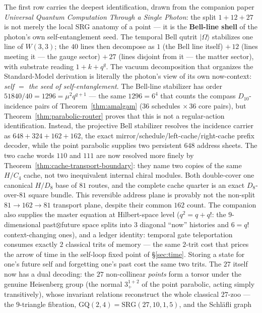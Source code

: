 \documentclass[11pt]{article}
\newcommand{\W}{W(3,3)}
\newcommand{\ket}[1]{|#1\rangle}
\begin{document}
The first row carries the deepest identification, drawn from the
companion paper \emph{Universal Quantum Computation Through a Single
Photon}: the split $1+12+27$ is not merely the local SRG anatomy of a
point --- it is the \textbf{Bell-line shell} of the photon's own
self-entanglement seed.  The temporal Bell qutrit $\ket\Omega$
stabilizes one line of $\W$; the $40$ lines then decompose as $1$
(the Bell line itself) $+\,12$ (lines meeting it --- the gauge
sector) $+\,27$ (lines disjoint from it --- the matter sector), with
substrate reading $1+k+q^q$.  The vacuum decomposition that organizes
the Standard-Model derivation is literally the photon's view of its
own now-context: \emph{self $=$ the seed of self-entanglement}.  The
Bell-line stabilizer has order $51840/40=1296=\mu^2 q^{q+1}$ --- the
same $1296=6^4$ that counts the compass $D_{10}$-incidence pairs of
Theorem~\ref{thm:amalgam} ($36$ schedules $\times\,36$ core pairs),
but Theorem~\ref{thm:parabolic-router} proves that this is not a
regular-action identification.  Instead, the projective Bell
stabilizer resolves the incidence carrier as
$648+324+162+162$, the exact mirror/schedule/left-cache/right-cache
prefix decoder, while the point parabolic supplies two persistent
$648$ address sheets.  The two cache words $110$ and $111$ are now
resolved more finely by Theorem~\ref{thm:cache-transport-boundary}:
they name two copies of the same $H/C_4$ cache, not two inequivalent
internal chiral modules.  Both double-cover one canonical $H/D_8$
base of $81$ routes, and the complete cache quarter is an exact
$D_8$-over-$81$ square bundle.  This reversible address plane is
provably not the non-split $81\to162\to81$ transport plane, despite
their common $162$ count.  The companion also supplies
the master equation at Hilbert-space level ($q^2=q+q!$: the
$9$-dimensional past$\otimes$future space splits into $3$ diagonal
``now'' histories and $6=q!$ context-changing ones), and a ledger
identity: temporal gate teleportation consumes exactly $2$ classical
trits of memory --- the same $2$-trit cost that prices the arrow of
time in the self-loop fixed point of \S\ref{sec:time}.  Storing a
state for one's future self and forgetting one's past cost the same
two trits.  The $27$ itself now has a dual decoding: the $27$
non-collinear \emph{points} form a torsor under the genuine
Heisenberg group (the normal $3^{1+2}_{+}$ of the point parabolic,
acting simply transitively), whose invariant relations reconstruct
the whole classical $27$-zoo --- the $9$-triangle fibration,
$\mathrm{GQ}(2,4)=\mathrm{SRG}(27,10,1,5)$, and the Schl\"afli graph
\end{document}
